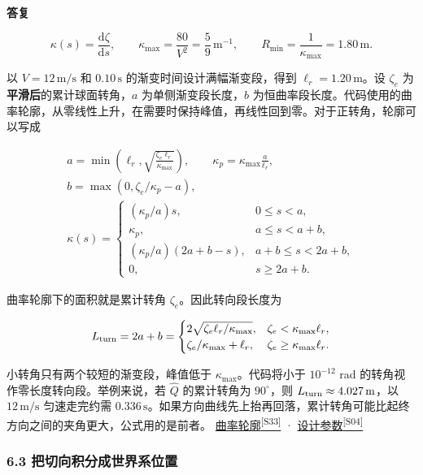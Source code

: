 \documentclass[11pt,a4paper]{article}
\numberwithin{equation}{topic}
\newenvironment{reply}{%
  \par\noindent\textcolor{replycolor}{\sffamily\bfseries 答复}\par\nobreak\ignorespaces
}{\par\medskip}
\newcommand{\sourceref}[2]{\hyperlink{source-#1}{#2\textsuperscript{[#1]}}}
\begin{document}
\begin{reply}
\begin{equation}
\label{eq:curvature}
\kappa(s)=\frac{\mathrm d\zeta}{\mathrm ds},\qquad
\kappa_{\max}=\frac{80}{V^2}=\frac59\,\mathrm{m^{-1}},
\qquad
R_{\min}=\frac{1}{\kappa_{\max}}=1.80\,\mathrm m.
\end{equation}

以 \(V=12\,\mathrm{m/s}\) 和 \(0.10\,\mathrm s\) 的渐变时间设计满幅渐变段，得到 \(\ell_r=1.20\,\mathrm m\)。设 \(\zeta_e\) 为\textbf{平滑后}的累计球面转角，\(a\) 为单侧渐变段长度，\(b\) 为恒曲率段长度。代码使用的曲率轮廓，从零线性上升，在需要时保持峰值，再线性回到零。对于正转角，轮廓可以写成

\begin{equation}
\label{eq:profile}
\begin{gathered}
a=\min\!\left(\ell_r,\sqrt{\frac{\zeta_e\ell_r}{\kappa_{\max}}}\right),
\qquad
\kappa_p=\kappa_{\max}\frac{a}{\ell_r},
\qquad\\
b=\max(0,\zeta_e/\kappa_p-a),\\[3pt]
\kappa(s)=
\begin{cases}
(\kappa_p/a)s,&0\le s<a,\\
\kappa_p,&a\le s<a+b,\\
(\kappa_p/a)(2a+b-s),&a+b\le s<2a+b,\\
0,&s\ge 2a+b.
\end{cases}
\end{gathered}
\end{equation}

曲率轮廓下的面积就是累计转角 \(\zeta_e\)。因此转向段长度为

\begin{equation}
\label{eq:turn-length}
L_{\rm turn}=2a+b=
\begin{cases}
2\sqrt{\zeta_e\ell_r/\kappa_{\max}},&
\zeta_e<\kappa_{\max}\ell_r,\\
\zeta_e/\kappa_{\max}+\ell_r,&
\zeta_e\ge\kappa_{\max}\ell_r.
\end{cases}
\end{equation}

小转角只有两个较短的渐变段，峰值低于 \(\kappa_{\max}\)。代码将小于 \(10^{-12}\) rad 的转角视作零长度转向段。举例来说，若 \(\widehat Q\) 的累计转角为 \(90^\circ\)，则 \(L_{\rm turn}\approx4.027\,\mathrm m\)，以 \(12\,\mathrm{m/s}\) 匀速走完约需 \(0.336\,\mathrm s\)。如果方向曲线先上抬再回落，累计转角可能比起终方向之间的夹角更大，公式用的是前者。 \sourceref{S33}{曲率轮廓} · \sourceref{S04}{设计参数}

\subsubsection*{6.3 把切向积分成世界系位置}


\end{reply}
\end{document}
